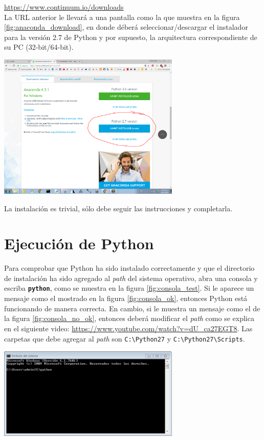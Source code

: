 \documentclass[12pt,letterpaper]{article}
\begin{document}
\url{https://www.continuum.io/downloads} \\

La URL anterior le llevará a una pantalla como la que muestra en la figura \ref{fig:anaconda_download}, en donde déberá seleccionar/descargar el instalador 
para la versión 2.7 de Python y por supuesto, la arquitectura correspondiente de su PC (32-bit/64-bit).

\begin{center}
\includegraphics[width=0.65\textwidth]{img/anaconda_download.PNG}
\label{fig:anaconda_download}
\end{center}

La instalación es trivial, sólo debe seguir las instrucciones y completarla.


\section{Ejecución de Python}

Para comprobar que Python ha sido instalado correctamente y que el directorio de instalación ha sido agregado al \textit{path} del 
sistema operativo, abra una consola y escriba {\bf\tt python}, como se muestra en la figura \ref{fig:consola_test}. Si le 
aparece un mensaje como el mostrado en la figura \ref{fig:consola_ok}, entonces Python está funcionando de manera correcta. 
En cambio, si le muestra un mensaje como el de la figura \ref{fig:consola_no_ok}, entonces deberá modificar el \textit{path} como 
se explica en el siguiente video: \url{https://www.youtube.com/watch?v=dU_ca27EGT8}. Las carpetas que debe agregar al \textit{path} son 
\verb|C:\Python27| y \verb|C:\Python27\Scripts|.


\begin{center}
\includegraphics[width=0.65\textwidth]{img/consola_test.PNG}
\label{fig:consola_test}
\end{center}
\end{document}
